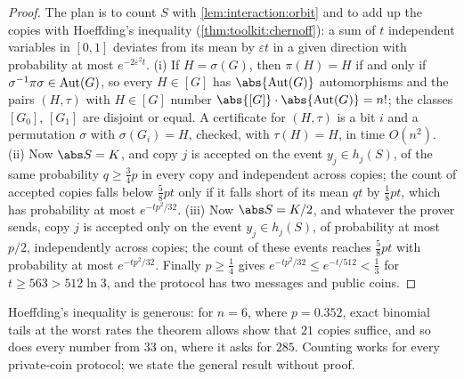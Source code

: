 \begin{refsection}

\begin{proof}
The plan is to count $S$ with \cref{lem:interaction:orbit} and to add up the copies with Hoeffding's inequality (\cref{thm:toolkit:chernoff}): a sum of $t$ independent variables in $[0,1]$ deviates from its mean by $\varepsilon t$ in a given direction with probability at most $e^{-2\varepsilon^2t}$. (i) If $H=\sigma(G)$, then $\pi(H)=H$ if and only if $\sigma^{-1}\pi\sigma\in\operatorname{Aut}(G)$, so every $H\in[G]$ has $\abs{\interactionaut(G)}$ automorphisms and the pairs $(H,\tau)$ with $H\in[G]$ number $\abs{[G]}\cdot\abs{\interactionaut(G)}=n!$; the classes $[G_0]$, $[G_1]$ are disjoint or equal. A certificate for $(H,\tau)$ is a bit $i$ and a permutation $\sigma$ with $\sigma(G_i)=H$, checked, with $\tau(H)=H$, in time $O(n^2)$. (ii) Now $\abs S=K$, and copy $j$ is accepted on the event $y_j\in h_j(S)$, of the same probability $q\ge\frac34p$ in every copy and independent across copies; the count of accepted copies falls below $\frac58pt$ only if it falls short of its mean $qt$ by $\frac18pt$, which has probability at most $e^{-tp^2/32}$. (iii) Now $\abs S=K/2$, and whatever the prover sends, copy $j$ is accepted only on the event $y_j\in h_j(S)$, of probability at most $p/2$, independently across copies; the count of these events reaches $\frac58pt$ with probability at most $e^{-tp^2/32}$. Finally $p\ge\frac14$ gives $e^{-tp^2/32}\le e^{-t/512}<\frac13$ for $t\ge563>512\ln3$, and the protocol has two messages and public coins.
\end{proof}

Hoeffding's inequality is generous: for $n=6$, where $p=0.352$, exact binomial tails at the worst rates the theorem allows show that $21$ copies suffice, and so does every number from $33$ on, where it asks for $285$. Counting works for every private-coin protocol; we state the general result without proof.


\end{refsection}
